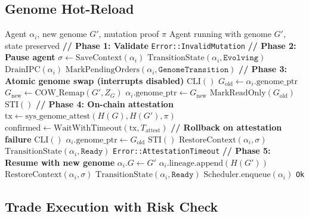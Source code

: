\documentclass{article}
\begin{document}
\subsection{Genome Hot-Reload}

\begin{algorithm}[t]
\caption{Genome Hot-Reload}
\label{alg:hotreload}
\begin{algorithmic}[1]
\REQUIRE Agent $\alpha_i$, new genome $G'$, mutation proof $\pi$
\ENSURE Agent running with genome $G'$, state preserved
\STATE \textbf{// Phase 1: Validate}
    \RETURN \texttt{Error::InvalidMutation}
\ENDIF
\STATE \textbf{// Phase 2: Pause agent}
\STATE $\sigma \leftarrow \text{SaveContext}(\alpha_i)$ 
\STATE $\text{TransitionState}(\alpha_i, \texttt{Evolving})$
\STATE $\text{DrainIPC}(\alpha_i)$ 
\STATE $\text{MarkPendingOrders}(\alpha_i, \texttt{GenomeTransition})$
\STATE \textbf{// Phase 3: Atomic genome swap (interrupts disabled)}
\STATE $\text{CLI}()$ 
\STATE $G_{\text{old}} \leftarrow \alpha_i.\text{genome\_ptr}$
\STATE $G_{\text{new}} \leftarrow \text{COW\_Remap}(G', Z_G)$ 
\STATE $\alpha_i.\text{genome\_ptr} \leftarrow G_{\text{new}}$
\STATE $\text{MarkReadOnly}(G_{\text{old}})$ 
\STATE $\text{STI}()$ 
\STATE \textbf{// Phase 4: On-chain attestation}
\STATE $\text{tx} \leftarrow \text{sys\_genome\_attest}(H(G), H(G'), \pi)$
\STATE $\text{confirmed} \leftarrow \text{WaitWithTimeout}(\text{tx}, T_{\text{attest}})$
    \STATE \textbf{// Rollback on attestation failure}
    \STATE $\text{CLI}()$
    \STATE $\alpha_i.\text{genome\_ptr} \leftarrow G_{\text{old}}$
    \STATE $\text{STI}()$
    \STATE $\text{RestoreContext}(\alpha_i, \sigma)$
    \STATE $\text{TransitionState}(\alpha_i, \texttt{Ready})$
    \RETURN \texttt{Error::AttestationTimeout}
\ENDIF
\STATE \textbf{// Phase 5: Resume with new genome}
\STATE $\alpha_i.G \leftarrow G'$
\STATE $\alpha_i.\text{lineage}.\text{append}(H(G'))$
\STATE $\text{RestoreContext}(\alpha_i, \sigma)$
\STATE $\text{TransitionState}(\alpha_i, \texttt{Ready})$
\STATE $\text{Scheduler}.\text{enqueue}(\alpha_i)$
\RETURN \texttt{Ok}
\end{algorithmic}
\end{algorithm}

\subsection{Trade Execution with Risk Check}
\end{document}

